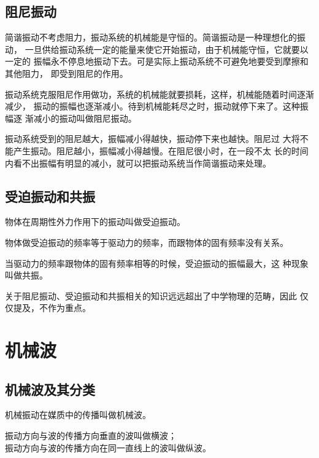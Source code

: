 \subsection{阻尼振动}
简谐振动不考虑阻力，振动系统的机械能是守恒的。简谐振动是一种理想化的振动，
一旦供给振动系统一定的能量来使它开始振动，由于机械能守恒，它就要以一定的
振幅永不停息地振动下去。可是实际上振动系统不可避免地要受到摩擦和其他阻力，
即受到阻尼的作用。
\begin{definition}
    振动系统克服阻尼作用做功，系统的机械能就要损耗，这样，机械能随着时间逐渐减少，
    振动的振幅也逐渐减小。待到机械能耗尽之时，振动就停下来了。这种振幅逐
    渐减小的振动叫做阻尼振动。
\end{definition}

振动系统受到的阻尼越大，振幅减小得越快，振动停下来也越快。阻尼过
大将不能产生振动。阻尼越小，振幅减小得越慢。在阻尼很小时，在一段不太
长的时间内看不出振幅有明显的减小，就可以把振动系统当作简谐振动来处理。

\subsection{受迫振动和共振}
\begin{definition}
    物体在周期性外力作用下的振动叫做受迫振动。
\end{definition}

\begin{theorem}
    物体做受迫振动的频率等于驱动力的频率，而跟物体的固有频率没有关系。
\end{theorem}

\begin{theorem}
    当驱动力的频率跟物体的固有频率相等的时候，受迫振动的振幅最大，这
    种现象叫做共振。
\end{theorem}

关于阻尼振动、受迫振动和共振相关的知识远远超出了中学物理的范畴，因此
仅仅提及，不作为重点。

\section{机械波}
\subsection{机械波及其分类}
\begin{definition}
    机械振动在媒质中的传播叫做机械波。
\end{definition}

\begin{definition}
    振动方向与波的传播方向垂直的波叫做横波；\\
    振动方向与波的传播方向在同一直线上的波叫做纵波。
\end{definition}

